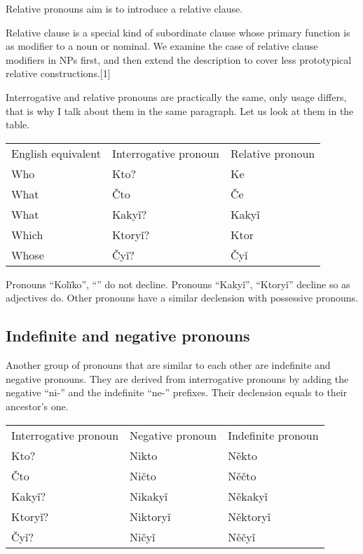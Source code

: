 Relative pronouns aim is to introduce a relative clause.

Relative clause is a special kind of subordinate clause whose primary function is as modifier to a noun or nominal. We examine the case of relative clause modifiers in NPs first, and then extend the description to cover less prototypical relative constructions.[1] 

Interrogative and relative pronouns are practically the same, only usage differs, that is why I talk about them in the same paragraph. Let us look at them in the table.

\begin{table}
	\begin{tabular}{lll}
		English equivalent & Interrogative pronoun & Relative pronoun \\
		Who & Kto? & Ke \\
		What & Čto & Če \\
		What & Kakyǐ? & Kakyǐ \\
		Which & Ktoryǐ? & Ktor \\
		Whose & Čyǐ? & Čyǐ 
	\end{tabular}
\end{table}

Pronouns “Kolïko”, “” do not decline. Pronouns “Kakyǐ”, “Ktoryǐ” decline so as adjectives do. Other pronouns have a similar declension with possessive pronouns.
  
\subsection{Indefinite and negative pronouns}

Another group of pronouns that are similar to each other are indefinite and negative pronouns. They are derived from interrogative pronouns by adding the negative “ni-” and the indefinite “ne-” prefixes. Their declension equals to their ancestor’s one.

\begin{table}
	\begin{tabular}{lll}
		Interrogative pronoun & Negative pronoun & Indefinite pronoun \\
		Kto? & Nikto & Někto \\
		Čto & Ničto & Něčto \\
		Kakyǐ? & Nikakyǐ & Někakyǐ \\
		Ktoryǐ? & Niktoryǐ & Něktoryǐ \\
		Čyǐ? & Ničyǐ & Něčyǐ 
	\end{tabular}
\end{table}

